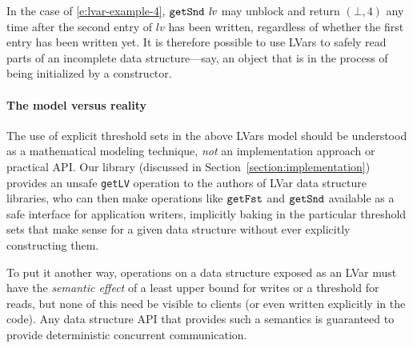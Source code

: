 In the case of \ref{e:lvar-example-4}, $\mbox{\texttt{getSnd}}~\mathit{lv}$ may unblock and
return $(\bot, 4)$ any time after the second entry of $\mathit{lv}$ has been
written, regardless of whether the first entry has been written yet.  It is
therefore possible to use LVars to safely read parts of an incomplete data
structure---say, an object that is in the process of being initialized by a
constructor.

\paragraph{The model versus reality}

The use of explicit threshold sets in the above LVars model should be understood
as a mathematical modeling technique, \emph{not} an implementation approach or
practical API.  Our library (discussed in Section~\ref{section:implementation})
provides an unsafe \texttt{getLV} operation to the authors of LVar data structure
libraries, who can then make operations like $\mbox{\texttt{getFst}}$ and $\mbox{\texttt{getSnd}}$ available as a safe
interface for application writers, implicitly baking in the particular threshold sets that make
sense for a given data structure without ever explicitly constructing them.

To put it another way, operations on a data structure exposed as an LVar must have
the \emph{semantic effect} of a least upper bound for writes or a threshold for
reads, but none of this need be visible to clients (or even written explicitly
in the code).  Any data structure API that provides such a semantics is
guaranteed to provide deterministic concurrent communication.

